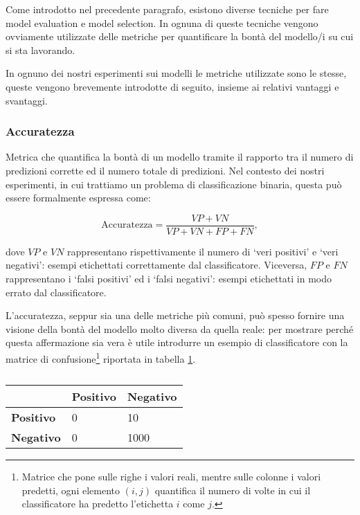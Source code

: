 \documentclass[../../main.tex]{subfiles}
\begin{document}
    Come introdotto nel precedente paragrafo, esistono diverse tecniche per fare model evaluation e model selection. In ognuna di queste tecniche vengono ovviamente utilizzate delle metriche per quantificare la bontà del modello/i su cui si sta lavorando.

    In ognuno dei nostri esperimenti sui modelli le metriche utilizzate sono le stesse, queste vengono brevemente introdotte di seguito, insieme ai relativi vantaggi e svantaggi.

    \subsubsection{Accuratezza}
    Metrica che quantifica la bontà di un modello tramite il rapporto tra il numero di predizioni corrette ed il numero totale di predizioni. Nel contesto dei nostri esperimenti, in cui trattiamo un problema di classificazione binaria, questa può essere formalmente espressa come: 

    \begin{equation}
        \mathrm{Accuratezza} = \frac{VP + VN}{VP + VN + FP + FN},
    \end{equation}

    dove $VP$ e $VN$ rappresentano rispettivamente il numero di `veri positivi' e `veri negativi': esempi etichettati correttamente dal classificatore. Viceversa, $FP$ e $FN$ rappresentano i `falsi positivi' ed i `falsi negativi': esempi etichettati in modo errato dal classificatore.

    L'accuratezza, seppur sia una delle metriche più comuni, può spesso fornire una visione della bontà del modello molto diversa da quella reale: per mostrare perché questa affermazione sia vera è utile introdurre un esempio di classificatore con la matrice di confusione\footnote{Matrice che pone sulle righe i valori reali, mentre sulle colonne i valori predetti, ogni elemento $(i,j)$ quantifica il numero di volte in cui il classificatore ha predetto l'etichetta $i$ come $j$.} riportata in tabella \ref{tab:matriceConfusione}.

    \begin{table}[H]
        \centering
        \begin{tabular}{l|ll}
                            & \textbf{Positivo} & \textbf{Negativo} \\ \hline
        \textbf{Positivo} & 0                 & 10                 \\
        \textbf{Negativo} & 0                 & 1000             
        \end{tabular}
        \caption{}  
        \label{tab:matriceConfusione}    
    \end{table}
\end{document}
